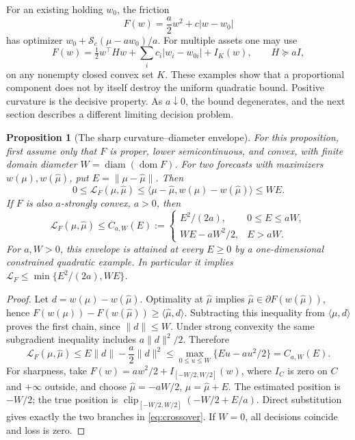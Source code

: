 \documentclass[11pt]{article}
\theoremstyle{plain}
\newtheorem{proposition}[theorem]{Proposition}
\theoremstyle{definition}
\theoremstyle{remark}
\newcommand{\norm}[1]{\lVert#1\rVert}
\newcommand{\soft}{\mathcal S}
\newcommand{\ip}[2]{\langle#1,#2\rangle}
\begin{document}
For an existing holding \(w_0\), the friction
\[
F(w)=\frac a2w^2+c|w-w_0|
\]
has optimizer \(w_0+\soft_c(\mu-aw_0)/a\).
For multiple assets one may use
\[
F(w)=\tfrac12w^\top H w+\sum_i c_i|w_i-w_{0i}|+I_K(w),
\qquad H\succeq aI,
\]
on any nonempty closed convex set \(K\).
These examples show that a proportional component does not by itself
destroy the uniform quadratic bound. Positive curvature is the
decisive property. As \(a\downarrow0\), the bound degenerates, and the
next section describes a different limiting decision problem.

\begin{proposition}[The sharp curvature--diameter envelope]
\label{prop:crossover}
For this proposition, first assume only that \(F\) is proper, lower
semicontinuous, and convex, with finite domain diameter
\(W=\operatorname{diam}(\operatorname{dom}F)\).
For two forecasts with maximizers \(w(\mu),w(\widehat\mu)\), put
\(E=\norm{\mu-\widehat\mu}\). Then
\[
0\le\mathcal L_F(\mu,\widehat\mu)
\le\ip{\mu-\widehat\mu}{w(\mu)-w(\widehat\mu)}\le WE.
\]
If \(F\) is also \(a\)-strongly convex, \(a>0\), then
\begin{equation}\label{eq:crossover}
\mathcal L_F(\mu,\widehat\mu)\le C_{a,W}(E):=
\begin{cases}
E^2/(2a),&0\le E\le aW,\\
WE-aW^2/2,&E>aW.
\end{cases}
\end{equation}
For \(a,W>0\), this envelope is attained at every \(E\ge0\) by a
one-dimensional constrained quadratic example. In particular it implies
\(\mathcal L_F\le\min\{E^2/(2a),WE\}\).
\end{proposition}
\begin{proof}
Let \(d=w(\mu)-w(\widehat\mu)\).
Optimality at \(\widehat\mu\) implies
\(\widehat\mu\in\partial F(w(\widehat\mu))\), hence
\(F(w(\mu))-F(w(\widehat\mu))\ge\ip{\widehat\mu}{d}\).
Subtracting this inequality from \(\ip\mu d\) proves the first
chain, since \(\norm d\le W\).
Under strong convexity the same subgradient inequality includes
\(a\norm d^2/2\). Therefore
\[
\mathcal L_F(\mu,\widehat\mu)
\le E\norm d-\frac a2\norm d^2
\le\max_{0\le u\le W}\{Eu-au^2/2\}=C_{a,W}(E).
\]
For sharpness, take
\(F(w)=aw^2/2+I_{[-W/2,W/2]}(w)\), where \(I_C\) is zero on
\(C\) and \(+\infty\) outside, and choose
\(\widehat\mu=-aW/2\), \(\mu=\widehat\mu+E\).
The estimated position is \(-W/2\); the true position is
\(\operatorname{clip}_{[-W/2,W/2]}(-W/2+E/a)\).
Direct substitution gives exactly the two branches in
\eqref{eq:crossover}. If \(W=0\), all decisions coincide and loss
is zero.
\end{proof}
\end{document}
